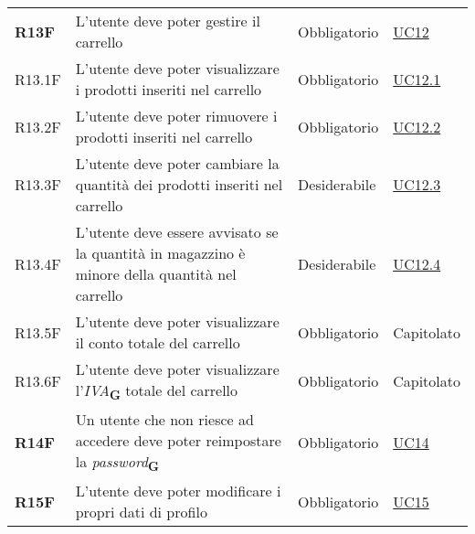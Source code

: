 \begin{center}
\begin{longtable}[!h]{p{50px} p{245px} p{75px} p{50px}}
        \textbf{R13F}                         & L'utente deve poter gestire il carrello                                                                                            & Obbligatorio             & \hyperref[sec:UC12]{UC12}                    \\
        R13.1F                                & L'utente deve poter visualizzare i prodotti inseriti nel carrello                                                                  & Obbligatorio             & \hyperref[sec:UC12.1]{UC12.1}                \\
        R13.2F                                & L'utente deve poter rimuovere i prodotti inseriti nel carrello                                                                     & Obbligatorio             & \hyperref[sec:UC12.2]{UC12.2}                \\
        R13.3F                                & L'utente deve poter cambiare la quantità dei prodotti inseriti nel carrello                                                        & Desiderabile             & \hyperref[sec:UC12.3]{UC12.3}                \\
        R13.4F                                & L'utente deve essere avvisato se la quantità in magazzino è minore della quantità nel carrello                                     & Desiderabile             & \hyperref[sec:UC12.4]{UC12.4}                \\
        R13.5F                                & L'utente deve poter visualizzare il conto totale del carrello                                                                      & Obbligatorio             & Capitolato                                   \\
        R13.6F                                & L'utente deve poter visualizzare l'\textit{IVA}\textsubscript{\textbf{G}} totale del carrello                                      & Obbligatorio             & Capitolato                                   \\
        \textbf{R14F}                         & Un utente che non riesce ad accedere deve poter reimpostare la \textit{password}\textsubscript{\textbf{G}}                         & Obbligatorio             & \hyperref[sec:UC14]{UC14}                    \\
        \textbf{R15F}                         & L'utente deve poter modificare i propri dati di profilo                                                                            & Obbligatorio             & \hyperref[sec:UC15]{UC15}                    \\

\end{longtable}
\end{center}
